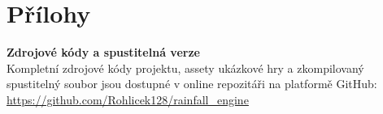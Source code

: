 \documentclass[12pt,a4paper]{article}
\begin{document}
\newpage
\section*{Přílohy}

\textbf{Zdrojové kódy a spustitelná verze} \\
    Kompletní zdrojové kódy projektu, assety ukázkové hry a zkompilovaný spustitelný soubor jsou dostupné v online repozitáři na platformě GitHub: \\
    \url{https://github.com/Rohlicek128/rainfall_engine}
\end{document}

